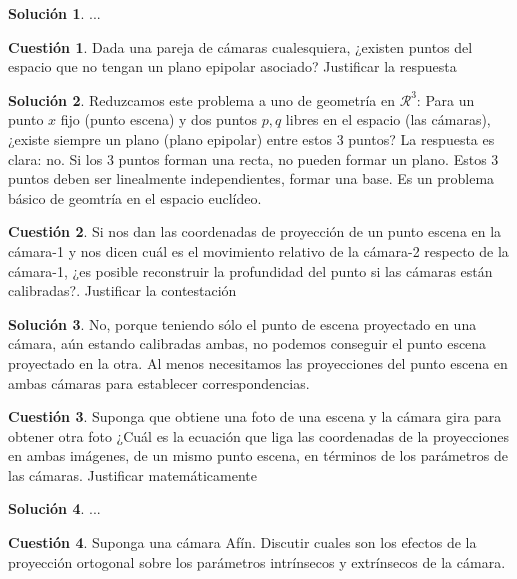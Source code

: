 \documentclass[a4paper, 11pt]{article}
\theoremstyle{definition}
\newtheorem{cuestion}{Cuestión}
\newtheorem*{solucion}{Solución}
\begin{document}
  \begin{solucion}
    ...
  \end{solucion}

  \begin{cuestion}
    Dada una pareja de cámaras cualesquiera, ¿existen puntos del espacio que no tengan un
    plano epipolar asociado? Justificar la respuesta
  \end{cuestion}

  \begin{solucion}
    Reduzcamos este problema a uno de geometría en $\mathcal{R}^3$: Para un
    punto $x$ fijo (punto escena) y dos puntos $p,q$ libres en el
    espacio (las cámaras), ¿existe siempre un plano (plano epipolar) entre estos 3 puntos?
    La respuesta es clara: no. Si los 3 puntos forman una recta, no pueden formar un plano.
    Estos 3 puntos deben ser linealmente independientes, formar una base. Es un problema
    básico de geomtría en el espacio euclídeo.
  \end{solucion}


  \begin{cuestion}
    Si nos dan las coordenadas de proyección de un punto escena en la cámara-1 y nos dicen
    cuál es el movimiento relativo de la cámara-2 respecto de la cámara-1, ¿es posible reconstruir
    la profundidad del punto si las cámaras están calibradas?. Justificar la contestación
  \end{cuestion}

  \begin{solucion}
     	No, porque teniendo sólo el punto de escena proyectado en una cámara, aún estando
      calibradas ambas, no podemos conseguir el punto escena proyectado en la otra. Al menos
      necesitamos las proyecciones del punto escena en ambas cámaras para establecer correspondencias. 
  \end{solucion}


  \begin{cuestion}
    Suponga que obtiene una foto de una escena y la cámara gira para obtener otra foto ¿Cuál
    es la ecuación que liga las coordenadas de la proyecciones en ambas imágenes, de un mismo
    punto escena, en términos de los parámetros de las cámaras. Justificar matemáticamente

  \end{cuestion}

  \begin{solucion}
     	...
  \end{solucion}
  \begin{cuestion}
    Suponga una cámara Afín. Discutir cuales son los efectos de la proyección ortogonal sobre
    los parámetros intrínsecos y extrínsecos de la cámara.

  \end{cuestion}
\end{document}
